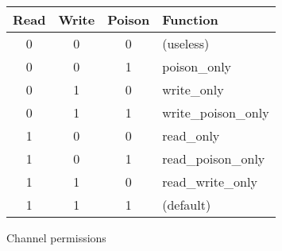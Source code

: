 \documentclass[a4paper,12pt]{article}
\begin{document}
\begin{figure}[h]
\centering
\begin{tabular}{c|c|c|l}
Read & Write & Poison & Function \\
\hline
0 & 0 & 0 & (useless) \\
0 & 0 & 1 & poison\_only \\
0 & 1 & 0 & write\_only \\
0 & 1 & 1 & write\_poison\_only \\
1 & 0 & 0 & read\_only \\
1 & 0 & 1 & read\_poison\_only \\
1 & 1 & 0 & read\_write\_only \\
1 & 1 & 1 & (default) \\
\end{tabular}
\caption{Channel permissions}
\label{channel-permissions}
\end{figure}
\end{document}
